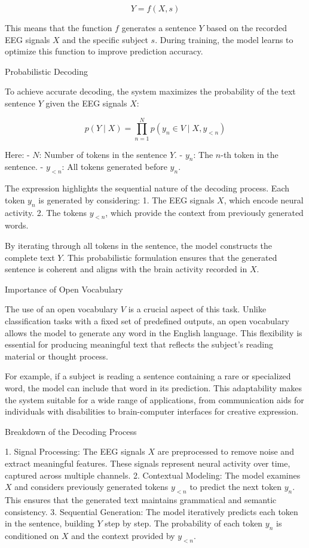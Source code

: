 \documentclass[journal]{IEEEtran}
\begin{document}
\begin{equation} Y = f(X, s)\end{equation}

This means that the function \(f\) generates a sentence \(Y\) based on the recorded EEG signals \(X\) and the specific subject \(s\). During training, the model learns to optimize this function to improve prediction accuracy.

Probabilistic Decoding

To achieve accurate decoding, the system maximizes the probability of the text sentence \(Y\) given the EEG signals \(X\):

\begin{equation} p(Y \mid X) = \prod_{n=1}^N p(y_n \in V \mid X, y_{<n})\end{equation}

Here:
- \(N\): Number of tokens in the sentence \(Y\).
- \(y_n\): The \(n\)-th token in the sentence.
- \(y_{<n}\): All tokens generated before \(y_n\).

The expression highlights the sequential nature of the decoding process. Each token \(y_n\) is generated by considering:
1. The EEG signals \(X\), which encode neural activity.
2. The tokens \(y_{<n}\), which provide the context from previously generated words.

By iterating through all tokens in the sentence, the model constructs the complete text \(Y\). This probabilistic formulation ensures that the generated sentence is coherent and aligns with the brain activity recorded in \(X\).

Importance of Open Vocabulary

The use of an open vocabulary \(V\) is a crucial aspect of this task. Unlike classification tasks with a fixed set of predefined outputs, an open vocabulary allows the model to generate any word in the English language. This flexibility is essential for producing meaningful text that reflects the subject's reading material or thought process.

For example, if a subject is reading a sentence containing a rare or specialized word, the model can include that word in its prediction. This adaptability makes the system suitable for a wide range of applications, from communication aids for individuals with disabilities to brain-computer interfaces for creative expression.

Breakdown of the Decoding Process

1. Signal Processing: The EEG signals \(X\) are preprocessed to remove noise and extract meaningful features. These signals represent neural activity over time, captured across multiple channels.
2. Contextual Modeling: The model examines \(X\) and considers previously generated tokens \(y_{<n}\) to predict the next token \(y_n\). This ensures that the generated text maintains grammatical and semantic consistency.
3. Sequential Generation: The model iteratively predicts each token in the sentence, building \(Y\) step by step. The probability of each token \(y_n\) is conditioned on \(X\) and the context provided by \(y_{<n}\).
\end{document}
